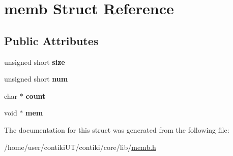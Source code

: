 \hypertarget{structmemb}{}\section{memb Struct Reference}
\label{structmemb}
\subsection*{Public Attributes}
\begin{DoxyCompactItemize}
\item 
\hypertarget{structmemb_a2065bdb18e555d6654b9bfd55e506978}{}unsigned short {\bfseries size}\label{structmemb_a2065bdb18e555d6654b9bfd55e506978}

\item 
\hypertarget{structmemb_abcabf6d8483632290436ef8d1b57a43e}{}unsigned short {\bfseries num}\label{structmemb_abcabf6d8483632290436ef8d1b57a43e}

\item 
\hypertarget{structmemb_a781a9c6a64cf1ce15b1b21787339e243}{}char $\ast$ {\bfseries count}\label{structmemb_a781a9c6a64cf1ce15b1b21787339e243}

\item 
\hypertarget{structmemb_a2bef4b5f9d4b3d1d6cbcb6da023402ad}{}void $\ast$ {\bfseries mem}\label{structmemb_a2bef4b5f9d4b3d1d6cbcb6da023402ad}

\end{DoxyCompactItemize}


The documentation for this struct was generated from the following file\+:\begin{DoxyCompactItemize}
\item 
/home/user/contiki\+U\+T/contiki/core/lib/\hyperlink{memb_8h}{memb.\+h}\end{DoxyCompactItemize}
